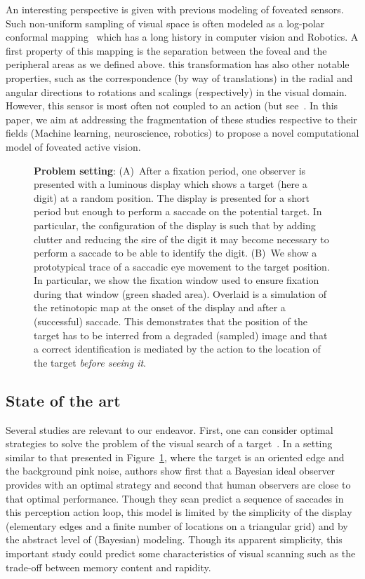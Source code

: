 An interesting perspective is given with previous modeling of foveated sensors. Such non-uniform sampling of visual space is often modeled as a log-polar conformal mapping~\citep{Traver10} which has a long history in computer vision and Robotics. A first property of this mapping is the separation between the foveal and the peripheral areas as we defined above. this transformation has also other notable properties, such as the correspondence (by way of translations) in the radial and angular directions to rotations and scalings (respectively) in the visual domain. However, this sensor is most often not coupled to an action (but see~\citep{ref needed)}. In this paper, we aim at addressing the fragmentation of these studies respective to their fields (Machine learning, neuroscience, robotics) to propose a novel computational model of foveated active vision.
\begin{figure}%
\caption{
{\bf Problem setting}:
(A)~After a fixation period, one observer is presented with a luminous display which shows a target (here a digit) at a random position. The display is presented for a short period but enough to perform a saccade on the potential target. In particular, the configuration of the display is such that by adding clutter and reducing the sire of the digit it may become necessary to perform a saccade to be able to identify the digit. %
(B)~We show a prototypical trace of a saccadic eye movement to the target position. In particular, we show the fixation window used to ensure fixation during that window (green shaded area). Overlaid is a simulation of the retinotopic map at the onset of the display and after a (successful) saccade. This demonstrates that the position of the target has to be interred from a degraded (sampled) image and that a correct identification is mediated by the action to the location of the target \emph{before seeing it}.
\label{fig:intro}}%
\end{figure}%
%
\subsection{State of the art}
%
Several studies are relevant to our endeavor. First, one can consider optimal strategies to solve the problem of the visual search of a target~\citep{Najemnik05}. In a setting similar to that presented in Figure~\ref{fig:intro}, where the target is an oriented edge and the background pink noise, authors show first that a Bayesian ideal observer provides with an optimal strategy and second that human observers are close to that optimal performance. Though they scan predict a sequence of saccades in this perception action loop, this model is limited by the simplicity of the display (elementary edges and a finite number of locations on a trian­gular grid) and by the abstract level of (Bayesian) modeling. Though its apparent simplicity, this important study could predict some characteristics of visual scanning such as the trade-off between memory content and rapidity.


